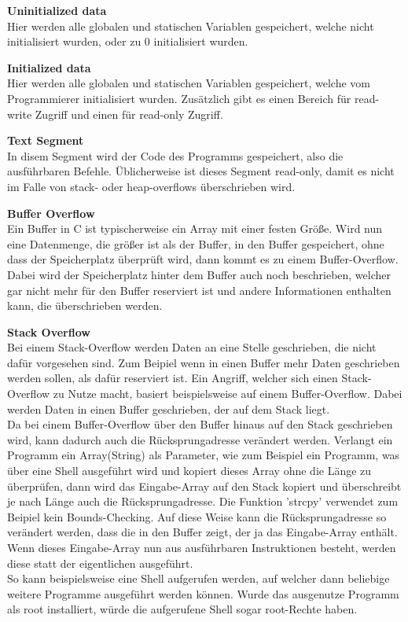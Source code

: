 \documentclass[12pt,a4paper]{article}
\begin{document}
	\textbf{Uninitialized data}\\
	Hier werden alle globalen und statischen Variablen gespeichert, welche nicht initialisiert wurden, oder 
	zu 0 initialisiert wurden.
	\bigskip
	
	\textbf{Initialized data}\\
	Hier werden alle globalen und statischen Variablen gespeichert, welche vom Programmierer initialisiert 
	wurden. 
	Zusätzlich gibt es einen Bereich für read-write Zugriff und einen für read-only Zugriff.
	\bigskip
	
	\textbf{Text Segment}\\
	In disem Segment wird der Code des Programms gespeichert, also die ausführbaren Befehle.
	Üblicherweise ist dieses Segment read-only, damit es nicht im Falle von stack- oder heap-overflows 
	überschrieben wird.
	\bigskip
	
	\textbf{Buffer Overflow}\\
	Ein Buffer in C ist typischerweise ein Array mit einer festen Größe. Wird nun eine Datenmenge, die 
	größer ist als der Buffer, in den Buffer gespeichert, ohne dass der Speicherplatz überprüft wird, 
	dann kommt es zu einem Buffer-Overflow. Dabei wird der Speicherplatz hinter dem Buffer auch noch
	beschrieben, welcher gar nicht mehr für den Buffer reserviert ist und andere Informationen enthalten 
	kann, die überschrieben werden.
	\bigskip
	
	\textbf{Stack Overflow}\\
	Bei einem Stack-Overflow werden Daten an eine Stelle geschrieben, die nicht dafür vorgesehen sind. 
	Zum Beipiel wenn in einen Buffer mehr Daten geschrieben werden sollen, als dafür reserviert ist.
	Ein Angriff, welcher sich einen Stack-Overflow zu Nutze macht, basiert beispielsweise auf einem 
	Buffer-Overflow. Dabei werden Daten in einen Buffer geschrieben, der auf dem Stack liegt.\\
	Da bei einem Buffer-Overflow über den Buffer hinaus auf den Stack geschrieben wird, kann dadurch auch 
	die Rücksprungadresse verändert werden. 
	Verlangt ein Programm ein Array(String) als Parameter, wie zum Beispiel ein Programm, was über eine Shell
	ausgeführt wird und kopiert dieses Array ohne die Länge zu überprüfen, dann wird das Eingabe-Array auf 
	den Stack kopiert und überschreibt je nach Länge auch die Rücksprungadresse. Die Funktion 'strcpy' 
	verwendet zum Beipiel kein Bounds-Checking.
	Auf diese Weise kann die Rücksprungadresse so verändert werden, dass die in den Buffer zeigt, der ja 
	das Eingabe-Array enthält. Wenn dieses Eingabe-Array nun aus ausführbaren Instruktionen besteht, werden 
	diese statt der eigentlichen ausgeführt.\\
	So kann beispielsweise eine Shell aufgerufen werden, auf welcher dann beliebige weitere Programme ausgeführt 
	werden können. 
	Wurde das ausgenutze Programm als root installiert, würde die aufgerufene Shell sogar root-Rechte haben.
	\bigskip
	
\end{document}
